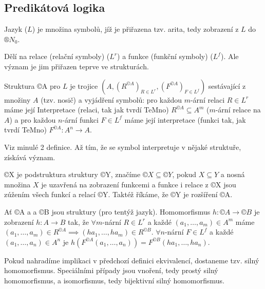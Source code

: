 \documentclass[12pt]{article}                   %
\begin{document}
    \subsection{Predikátová logika}
        \begin{definice}[Jazyk (= signatura), arita]
            Jazyk ($L$) je množina symbolů, jíž je přiřazena tzv. arita, tedy zobrazení z $L$ do $®N_0$.

            Dělí na relace (relační symboly) ($L^r$) a funkce (funkční symboly) ($L^f$). Ale význam je jim přiřazen teprve ve strukturách.
        \end{definice}

        \begin{definice}[Struktura]
            Struktura ©A pro $L$ je trojice $(A, (R^{©A})_{R \in L^r}, (F^{©A})_{F \in L^f})$ sestávající z množiny $A$ (tzv. nosič) a vyjádření symbolů: pro každou $m$-ární relaci $R \in L^r$ máme její Interpretace (relaci, tak jak tvrdí TeMno) $R^{©A} \subseteq A^m$ ($m$-ární relace na $A$) a pro každou $n$-ární funkci $F \in L^f$ máme její interpretace (funkci tak, jak tvrdí TeMno) $F^{©A}: A^n \rightarrow A$.
        \end{definice}

        \begin{definice}
            Viz minulé 2 definice. Až tím, že se symbol interpretuje v nějaké struktuře, získává význam.
        \end{definice}

        \begin{definice}
            ©X je podstruktura struktury ©Y, značíme $©X \subseteq ©Y$, pokud $X \subseteq Y$ a nosná množina $X$ je uzavřená na zobrazení funkcemi a funkce i relace z ©X jsou zúžením všech funkcí a relací ©Y. Taktéž říkáme, že ©Y je rozšíření ©A.
        \end{definice}

        \begin{definice}
            Ať ©A a a ©B jsou struktury (pro tentýž jazyk). Homomorfismus $h: ©A \rightarrow ©B$ je zobrazení $h: A \rightarrow B$ tak, že $\forall m$-nární $R \in L^r$ a každé $(a_1, …, a_m)\in A^m$ máme $(a_1, …, a_m) \in R^{©A} \implies (ha_1, …, ha_m) \in R^{©B}$. $\forall n$-nární $F \in L^f$ a každé $(a_1, …, a_n) \in A^n$ je $h(F^{©A}(a_1, …, a_n)) = F^{©B}(ha_1, …, ha_n)$.

            Pokud nahradíme implikaci v předchozí definici ekvivalencí, dostaneme tzv. silný homomorfismus. Speciálními případy jsou vnoření, tedy prostý silný homomorfismus, a isomorfismus, tedy bijektivní silný homomorfismus.
        \end{definice}
\end{document}
